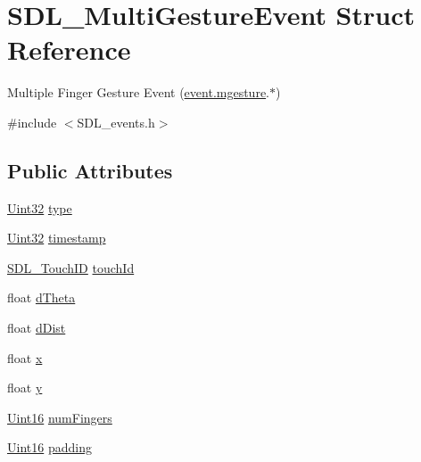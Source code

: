 \hypertarget{struct_s_d_l___multi_gesture_event}{\section{S\-D\-L\-\_\-\-Multi\-Gesture\-Event Struct Reference}
\label{struct_s_d_l___multi_gesture_event}
}


Multiple Finger Gesture Event (\hyperlink{union_s_d_l___event_ac19b3c6a6b5181a51eb4fbe2cbe726a9}{event.\-mgesture}.$\ast$)  




{\ttfamily \#include $<$S\-D\-L\-\_\-events.\-h$>$}

\subsection*{Public Attributes}
\begin{DoxyCompactItemize}
\item 
\hyperlink{_s_d_l__stdinc_8h_add440eff171ea5f55cb00c4a9ab8672d}{Uint32} \hyperlink{struct_s_d_l___multi_gesture_event_ab0c7adc9a3f71cc3532bfe0ff8cc6120}{type}
\item 
\hyperlink{_s_d_l__stdinc_8h_add440eff171ea5f55cb00c4a9ab8672d}{Uint32} \hyperlink{struct_s_d_l___multi_gesture_event_a7e99a98debf3ce11f6d2a2fbb3637175}{timestamp}
\item 
\hyperlink{_s_d_l__touch_8h_a10f5f86abe4ea8308a8706bd5d3b337a}{S\-D\-L\-\_\-\-Touch\-I\-D} \hyperlink{struct_s_d_l___multi_gesture_event_aa15d1201559a3c9277082af71a972dc1}{touch\-Id}
\item 
float \hyperlink{struct_s_d_l___multi_gesture_event_a4f4a920dcf5205baa24a140df56f3153}{d\-Theta}
\item 
float \hyperlink{struct_s_d_l___multi_gesture_event_a351c29785c5ce3f68c4591a427265f14}{d\-Dist}
\item 
float \hyperlink{struct_s_d_l___multi_gesture_event_a1708fc3c788fd12cc0beb5dc05cf31ca}{x}
\item 
float \hyperlink{struct_s_d_l___multi_gesture_event_a264602b9c5cc027eb6a283adda428454}{y}
\item 
\hyperlink{_s_d_l__stdinc_8h_a31fcc0a076c9068668173ee26d33e42b}{Uint16} \hyperlink{struct_s_d_l___multi_gesture_event_a6b06cf80372ce3cad40110fdb6ef0353}{num\-Fingers}
\item 
\hyperlink{_s_d_l__stdinc_8h_a31fcc0a076c9068668173ee26d33e42b}{Uint16} \hyperlink{struct_s_d_l___multi_gesture_event_a4804ec87789e697aba138c4888bb304b}{padding}
\end{DoxyCompactItemize}


